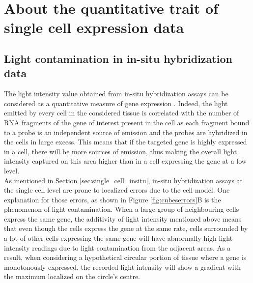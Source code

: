 \section{About the quantitative trait of single cell expression data}\label{sec:quantitative_single_cell}
  \subsection{Light contamination in in-situ hybridization data}
  The light intensity value obtained from in-situ hybridization assays can be considered as a quantitative measure of gene expression \cite{dorresteijn90}. Indeed, the light emitted by every cell in the considered tissue is correlated with the number of RNA fragments of the gene of interest present in the cell as each fragment bound to a probe is an independent source of emission and the probes are hybridized in the cells in large excess. This means that if the targeted gene is highly expressed in a cell, there will be more sources of emission, thus making the overall light intensity captured on this area higher than in a cell expressing the gene at a low level. \\
  
  As mentioned in Section \ref{sec:single_cell_insitu}, in-situ hybridization assays at the single cell level are prone to localized errors due to the cell model. One explanation for those errors, as shown in Figure \ref{fig:cubeserrors}B is the phenomenon of light contamination. When a large group of neighbouring cells express the same gene, the additivity of light intensity mentioned above means that even though the cells express the gene at the same rate, cells surrounded by a lot of other cells expressing the same gene will have abnormally high light intensity readings due to light contamination from the adjacent areas. As a result, when considering a hypothetical circular portion of tissue where a gene is monotonously expressed, the recorded light intensity will show a gradient with the maximum localized on the circle's centre.\\
  
